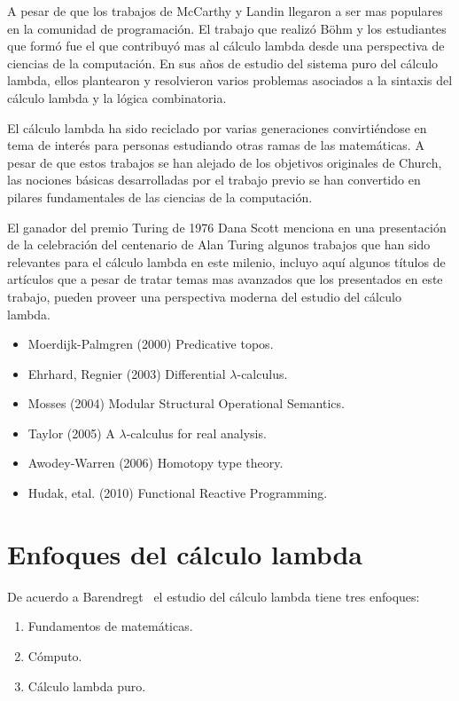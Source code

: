 A pesar de que los trabajos de McCarthy y Landin llegaron a ser mas
populares en la comunidad de programación. El trabajo que realizó Böhm
y los estudiantes que formó fue el que contribuyó mas al cálculo lambda desde
una perspectiva de ciencias de la computación. En sus años de estudio
del sistema puro del cálculo lambda, ellos plantearon y resolvieron varios
problemas asociados a la sintaxis del cálculo lambda y la lógica combinatoria.\

El cálculo lambda ha sido reciclado por varias generaciones convirtiéndose en
tema de interés para personas estudiando otras ramas de las
matemáticas. A pesar de que estos trabajos se han alejado de los
objetivos originales de Church, las  nociones básicas desarrolladas
por el trabajo previo se han convertido en pilares fundamentales de
las ciencias de la computación.\

El ganador del premio Turing de 1976 Dana Scott menciona en una
presentación de la celebración del centenario de Alan Turing
\cite{Scott:TuringCentenary} algunos
trabajos que han sido relevantes para el cálculo lambda en este milenio,
incluyo aquí algunos títulos de artículos que a pesar de tratar temas
mas avanzados que los presentados en este trabajo, pueden proveer una
perspectiva moderna del estudio del cálculo lambda.\

\begin{itemize}
\item Moerdijk-Palmgren (2000) Predicative topos.
\item Ehrhard, Regnier (2003) Differential \(\lambda\)-calculus.
\item Mosses (2004) Modular Structural Operational Semantics.
\item Taylor (2005) A \(\lambda\)-calculus for real analysis.
\item Awodey-Warren (2006) Homotopy type theory.
\item Hudak, etal. (2010) Functional Reactive Programming.
\end{itemize}



\section{Enfoques del cálculo lambda}

De acuerdo a Barendregt~\cite{Barendregt:Bible} el estudio del cálculo lambda
tiene tres enfoques:

\begin{enumerate}[I]
\item Fundamentos de matemáticas.
\item Cómputo.
\item Cálculo lambda puro.
\end{enumerate}

